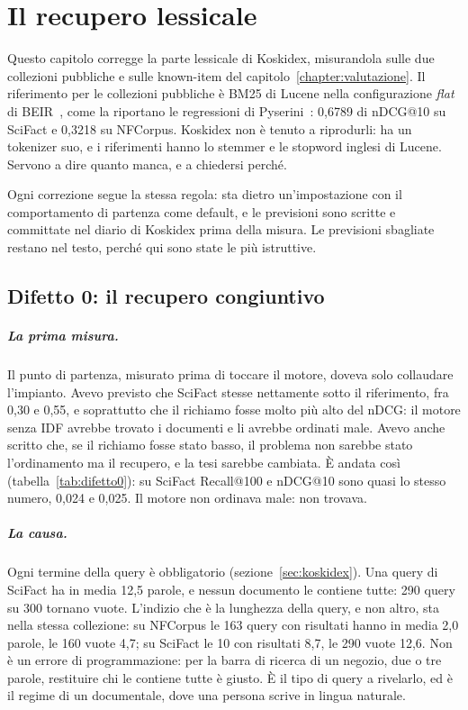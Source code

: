 \chapter{Il recupero lessicale}\label{chapter:lessicale}

Questo capitolo corregge la parte lessicale di Koskidex, misurandola sulle due
collezioni pubbliche e sulle known-item del capitolo~\ref{chapter:valutazione}.
Il riferimento per le collezioni pubbliche è BM25 di Lucene nella configurazione
\emph{flat} di BEIR~\cite{thakur2021beir}, come la riportano le regressioni di
Pyserini~\cite{pyserini2cr}: 0,6789 di nDCG@10 su SciFact e 0,3218 su NFCorpus.
Koskidex non è tenuto a riprodurli: ha un tokenizer suo, e i riferimenti hanno lo
stemmer e le stopword inglesi di Lucene. Servono a dire quanto manca, e a
chiedersi perché.

Ogni correzione segue la stessa regola: sta dietro un'impostazione con il
comportamento di partenza come default, e le previsioni sono scritte e
committate nel diario di Koskidex prima della misura. Le previsioni sbagliate
restano nel testo, perché qui sono state le più istruttive.

\section{Difetto 0: il recupero congiuntivo}\label{sec:difetto0}

\paragraph{La prima misura.} Il punto di partenza, misurato prima di toccare il
motore, doveva solo collaudare l'impianto. Avevo previsto che SciFact stesse
nettamente sotto il riferimento, fra 0,30 e 0,55, e soprattutto che il richiamo
fosse molto più alto del nDCG: il motore senza IDF avrebbe trovato i documenti e
li avrebbe ordinati male. Avevo anche scritto che, se il richiamo fosse stato
basso, il problema non sarebbe stato l'ordinamento ma il recupero, e la tesi
sarebbe cambiata. È andata così (tabella~\ref{tab:difetto0}): su SciFact
Recall@100 e nDCG@10 sono quasi lo stesso numero, 0,024 e 0,025. Il motore non ordinava male:
non trovava.

\paragraph{La causa.} Ogni termine della query è obbligatorio
(sezione~\ref{sec:koskidex}). Una query di SciFact ha in media 12,5 parole, e
nessun documento le contiene tutte: 290 query su 300 tornano vuote. L'indizio che
è la lunghezza della query, e non altro, sta nella stessa collezione: su NFCorpus
le 163 query con risultati hanno in media 2,0 parole, le 160 vuote 4,7; su
SciFact le 10 con risultati 8,7, le 290 vuote 12,6. Non è un errore di
programmazione: per la barra di ricerca di un negozio, due o tre parole,
restituire chi le contiene tutte è giusto. È il tipo di query a rivelarlo, ed è
il regime di un documentale, dove una persona scrive in lingua naturale.

